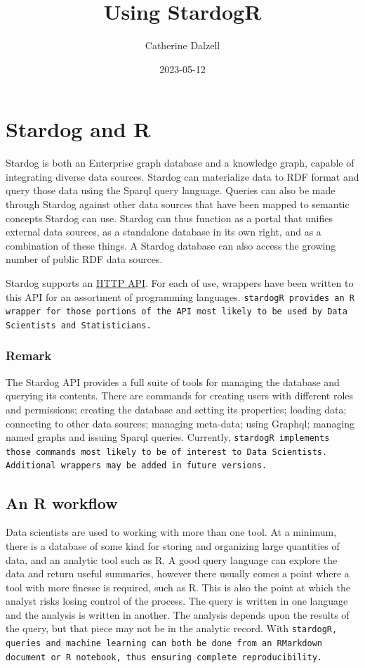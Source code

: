 \documentclass{article}\usepackage[]{graphicx}\usepackage[]{xcolor}
\title{Using StardogR}
\author{Catherine Dalzell}
\date{2023-05-12}
\begin{document}
\maketitle

\tableofcontents







\section{Stardog and R}

Stardog is both an Enterprise graph database and a knowledge graph, capable of integrating diverse data sources. Stardog can materialize data to RDF format and query those data using the Sparql query language. Queries can also be made through Stardog against other data sources that have been mapped to semantic concepts Stardog can use. Stardog can thus function as a portal that unifies external data sources, as a standalone database in its own right, and as a combination of these things. A Stardog database can also access the growing number of public RDF data sources.

Stardog supports an \href{https://stardog-union.github.io/http-docs/}{HTTP API}. For each of use, wrappers have been written to this API for an assortment of programming languages. \tt{stardogR} provides an R wrapper for those portions of the API most likely to be used by Data Scientists and Statisticians.

\subsubsection*{Remark}
The Stardog API provides a full suite of tools for managing the database and querying its contents. There are commands for creating users with different roles and permissions; creating the database and setting its properties; loading data; connecting to other data sources; managing meta-data; using Graphql; managing named graphs and issuing Sparql queries. Currently, \tt{stardogR} implements those commands most likely to be of interest to Data Scientists. Additional wrappers may be added in future versions.

\subsection{An R workflow}

Data scientists are used to working with more than one tool. At a minimum, there is a database of some kind for storing and organizing large quantities of data, and an analytic tool such as R. A good query language can explore the data and return useful summaries, however there usually comes a point where a tool with more finesse is required, such as R. This is also the point at which the analyst risks losing control of the process. The query is written in one language and the analysis is written in another. The analysis depends upon the results of the query, but that piece may not be in the analytic record. With \tt{stardogR}, queries and machine learning can both be done from an RMarkdown document or R notebook, thus ensuring complete reproducibility.
\end{document}
